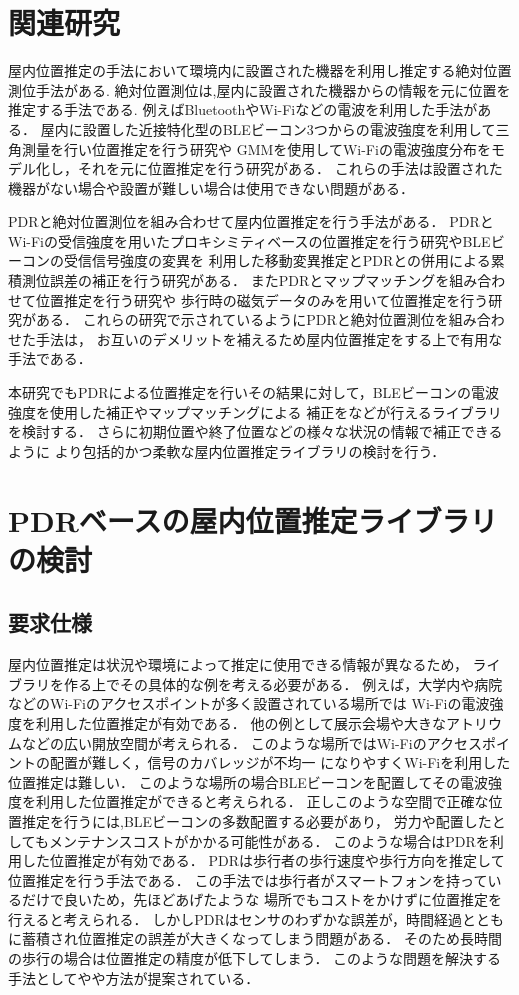 
\section{関連研究}
屋内位置推定の手法において環境内に設置された機器を利用し推定する絶対位置測位手法がある.
絶対位置測位は,屋内に設置された機器からの情報を元に位置を推定する手法である.
例えばBluetoothやWi-Fiなどの電波を利用した手法がある．
屋内に設置した近接特化型のBLEビーコン3つからの電波強度を利用して三角測量を行い位置推定を行う研究\cite{ble-indoor}や
GMMを使用してWi-Fiの電波強度分布をモデル化し，それを元に位置推定を行う研究\cite{wifi-gmm}がある．
これらの手法は設置された機器がない場合や設置が難しい場合は使用できない問題がある．

PDRと絶対位置測位を組み合わせて屋内位置推定を行う手法がある．
PDRとWi-Fiの受信強度を用いたプロキシミティベースの位置推定を行う研究\cite{pdr-wifi}やBLEビーコンの受信信号強度の変異を
利用した移動変異推定とPDRとの併用による累積測位誤差の補正を行う研究\cite{pdr-ble}がある．
またPDRとマップマッチングを組み合わせて位置推定を行う研究\cite{pdr-map}や
歩行時の磁気データのみを用いて位置推定を行う研究\cite{pdr-mag}がある．
これらの研究で示されているようにPDRと絶対位置測位を組み合わせた手法は，
お互いのデメリットを補えるため屋内位置推定をする上で有用な手法である．

本研究でもPDRによる位置推定を行いその結果に対して，BLEビーコンの電波強度を使用した補正やマップマッチングによる
補正をなどが行えるライブラリを検討する．
さらに初期位置や終了位置などの様々な状況の情報で補正できるように
より包括的かつ柔軟な屋内位置推定ライブラリの検討を行う．

\section{PDRベースの屋内位置推定ライブラリの検討}

\subsection{要求仕様}

屋内位置推定は状況や環境によって推定に使用できる情報が異なるため，
ライブラリを作る上でその具体的な例を考える必要がある．
例えば，大学内や病院などのWi-Fiのアクセスポイントが多く設置されている場所では
Wi-Fiの電波強度を利用した位置推定が有効である．
他の例として展示会場や大きなアトリウムなどの広い開放空間が考えられる．
このような場所ではWi-Fiのアクセスポイントの配置が難しく，信号のカバレッジが不均一
になりやすくWi-Fiを利用した位置推定は難しい．
このような場所の場合BLEビーコンを配置してその電波強度を利用した位置推定ができると考えられる．
正しこのような空間で正確な位置推定を行うには,BLEビーコンの多数配置する必要があり，
労力や配置したとしてもメンテナンスコストがかかる可能性がある．
このような場合はPDRを利用した位置推定が有効である．
PDRは歩行者の歩行速度や歩行方向を推定して位置推定を行う手法である．
この手法では歩行者がスマートフォンを持っているだけで良いため，先ほどあげたような
場所でもコストをかけずに位置推定を行えると考えられる．
しかしPDRはセンサのわずかな誤差が，時間経過とともに蓄積され位置推定の誤差が大きくなってしまう問題がある．
そのため長時間の歩行の場合は位置推定の精度が低下してしまう．
このような問題を解決する手法として\cite{pdr-wifi}や\cite{pdr-ble}や方法が提案されている．


